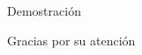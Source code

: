 \documentclass{beamer}
\begin{document}

\begin{frame}
\Huge{\centerline{Demostraci\'on}}
\end{frame}


\begin{frame}
\Huge{\centerline{Gracias por su atenci\'on}}
\end{frame}

\end{document}
